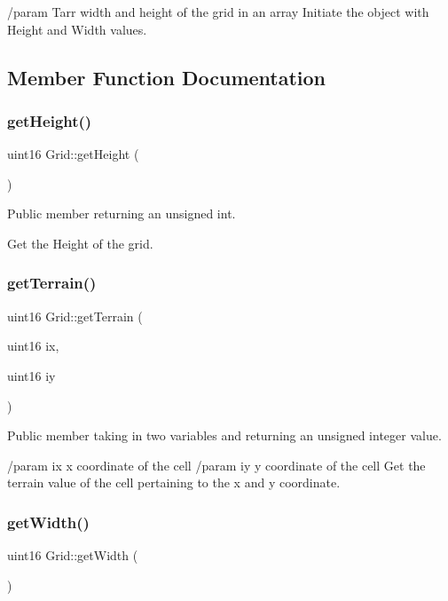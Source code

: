 /param Tarr width and height of the grid in an array Initiate the object with Height and Width values. 

\subsection{Member Function Documentation}
\hypertarget{class_grid_a374615638fd9e5f587d28486295952ef}{}\label{class_grid_a374615638fd9e5f587d28486295952ef} 
\subsubsection{\texorpdfstring{get\+Height()}{getHeight()}}
{\footnotesize\ttfamily uint16 Grid\+::get\+Height (\begin{DoxyParamCaption}{ }\end{DoxyParamCaption})}



Public member returning an unsigned int. 

Get the Height of the grid. \hypertarget{class_grid_a165ea0d0c65632335dbe7df2bc34a030}{}\label{class_grid_a165ea0d0c65632335dbe7df2bc34a030} 
\subsubsection{\texorpdfstring{get\+Terrain()}{getTerrain()}}
{\footnotesize\ttfamily uint16 Grid\+::get\+Terrain (\begin{DoxyParamCaption}\item[{uint16}]{ix,  }\item[{uint16}]{iy }\end{DoxyParamCaption})}



Public member taking in two variables and returning an unsigned integer value. 

/param ix x coordinate of the cell /param iy y coordinate of the cell Get the terrain value of the cell pertaining to the x and y coordinate. \hypertarget{class_grid_ab03502a2a92f1890e5e453e5878c66db}{}\label{class_grid_ab03502a2a92f1890e5e453e5878c66db} 
\subsubsection{\texorpdfstring{get\+Width()}{getWidth()}}
{\footnotesize\ttfamily uint16 Grid\+::get\+Width (\begin{DoxyParamCaption}{ }\end{DoxyParamCaption})}



